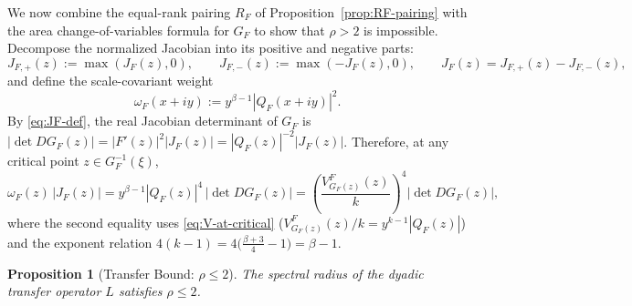 \documentclass[12pt]{article}
\newtheorem{prop}[thm]{Proposition}
\theoremstyle{definition}
\numberwithin{equation}{section}
\begin{document}
We now combine the equal-rank pairing $R_F$ of Proposition~\ref{prop:RF-pairing} with the area change-of-variables formula for $G_F$ to show that $\rho > 2$ is impossible. Decompose the normalized Jacobian into its positive and negative parts:
\begin{equation}\label{eq:J-plus-minus}
  J_{F, +}(z) := \max(J_F(z), 0), \qquad J_{F, -}(z) := \max(-J_F(z), 0), \qquad J_F(z) = J_{F, +}(z) - J_{F, -}(z),
\end{equation}
and define the scale-covariant weight
\begin{equation}\label{eq:omega-def}
  \omega_F(x + iy) := y^{\beta - 1} |Q_F(x + iy)|^2.
\end{equation}
By \eqref{eq:JF-def}, the real Jacobian determinant of $G_F$ is $|\det DG_F(z)| = |F'(z)|^2 |J_F(z)| = |Q_F(z)|^{-2} |J_F(z)|$. Therefore, at any critical point $z \in G_F^{-1}(\xi)$,
\begin{equation}\label{eq:omega-jacobian-bridge}
  \omega_F(z) \, |J_F(z)| = y^{\beta - 1} |Q_F(z)|^4 \, |\det DG_F(z)| = \left(\frac{V_{G_F(z)}^F(z)}{k}\right)^4 |\det DG_F(z)|,
\end{equation}
where the second equality uses \eqref{eq:V-at-critical} ($V_{G_F(z)}^F(z)/k = y^{k-1}|Q_F(z)|$) and the exponent relation $4(k - 1) = 4\big(\frac{\beta+3}{4} - 1\big) = \beta - 1$.

\begin{prop}[Transfer Bound: $\rho \le 2$]\label{prop:rho-le-2}
The spectral radius of the dyadic transfer operator $L$ satisfies $\rho \le 2$.
\end{prop}
\end{document}
